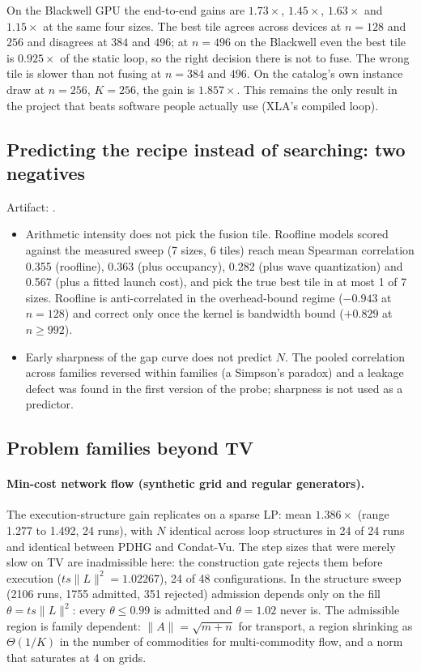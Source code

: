 On the Blackwell GPU the end-to-end gains are $1.73\times$, $1.45\times$,
$1.63\times$ and $1.15\times$ at the same four sizes. The best tile agrees
across devices at $n=128$ and $256$ and disagrees at $384$ and $496$; at
$n=496$ on the Blackwell even the best tile is $0.925\times$ of the static
loop, so the right decision there is not to fuse. The wrong tile is slower
than not fusing at $n=384$ and $496$. On the catalog's own instance draw at
$n=256$, $K=256$, the gain is $1.857\times$. This remains the only result in
the project that beats software people actually use (XLA's compiled loop).

\subsection{Predicting the recipe instead of searching: two negatives}
\label{app:log:diagnostics}

Artifact: .

\begin{itemize}
\item Arithmetic intensity does not pick the fusion tile. Roofline models
 scored against the measured sweep (7 sizes, 6 tiles) reach mean Spearman
 correlation 0.355 (roofline), 0.363 (plus occupancy), 0.282 (plus wave
 quantization) and 0.567 (plus a fitted launch cost), and pick the true best
 tile in at most 1 of 7 sizes. Roofline is anti-correlated in the
 overhead-bound regime ($-0.943$ at $n=128$) and correct only once the
 kernel is bandwidth bound ($+0.829$ at $n\ge992$).
\item Early sharpness of the gap curve does not predict $N$. The pooled
 correlation across families reversed within families (a Simpson's paradox)
 and a leakage defect was found in the first version of the probe; sharpness
 is not used as a predictor.
\end{itemize}

\subsection{Problem families beyond TV}
\label{app:log:families}

\paragraph{Min-cost network flow (synthetic grid and regular generators).}

The execution-structure gain replicates on a sparse LP: mean $1.386\times$
(range 1.277 to 1.492, 24 runs), with $N$ identical across loop structures
in 24 of 24 runs and identical between PDHG and Condat-Vu. The step sizes
that were merely slow on TV are inadmissible here: the construction gate
rejects them before execution ($t s \|L\|^2 = 1.02267$), 24 of 48
configurations. In the structure sweep (2106 runs, 1755 admitted, 351
rejected) admission depends only on the fill $\theta = t s \|L\|^2$: every
$\theta\le0.99$ is admitted and $\theta=1.02$ never is. The admissible
region is family dependent: $\|A\|=\sqrt{m+n}$ for transport, a region
shrinking as $\Theta(1/K)$ in the number of commodities for multi-commodity
flow, and a norm that saturates at 4 on grids.

